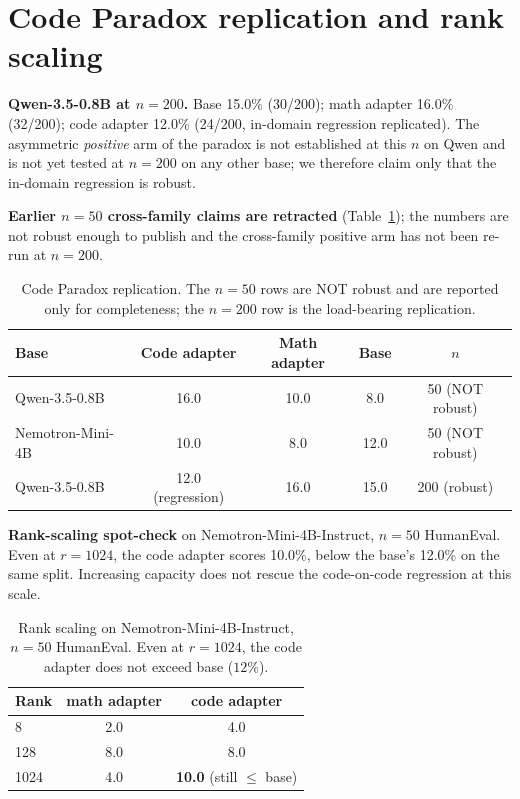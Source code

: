 \documentclass{article}
\begin{document}
\appendix

\section{Code Paradox replication and rank scaling}
\label{app:replication}

\textbf{Qwen-3.5-0.8B at $n=200$.} Base 15.0\% (30/200); math adapter 16.0\% (32/200); code adapter 12.0\% (24/200, in-domain regression replicated). The asymmetric \emph{positive} arm of the paradox is not established at this $n$ on Qwen and is not yet tested at $n=200$ on any other base; we therefore claim only that the in-domain regression is robust.

\textbf{Earlier $n=50$ cross-family claims are retracted} (Table~\ref{tab:replication-app}); the numbers are not robust enough to publish and the cross-family positive arm has not been re-run at $n=200$.

\begin{table}[h]
  \caption{Code Paradox replication. The $n=50$ rows are NOT robust and are reported only for completeness; the $n=200$ row is the load-bearing replication.}
  \label{tab:replication-app}
  \centering
  \small
  \begin{tabular}{lcccc}
    \toprule
    Base & Code adapter & Math adapter & Base & $n$ \\
    \midrule
    Qwen-3.5-0.8B    & 16.0 & 10.0 &  8.0 & 50 (NOT robust) \\
    Nemotron-Mini-4B & 10.0 &  8.0 & 12.0 & 50 (NOT robust) \\
    Qwen-3.5-0.8B    & 12.0 (regression) & 16.0 & 15.0 & 200 (robust) \\
    \bottomrule
  \end{tabular}
\end{table}

\textbf{Rank-scaling spot-check} on Nemotron-Mini-4B-Instruct, $n=50$ HumanEval. Even at $r=1024$, the code adapter scores 10.0\%, below the base's 12.0\% on the same split. Increasing capacity does not rescue the code-on-code regression at this scale.

\begin{table}[h]
  \caption{Rank scaling on Nemotron-Mini-4B-Instruct, $n=50$ HumanEval. Even at $r=1024$, the code adapter does not exceed base ($12\%$).}
  \label{tab:rank-app}
  \centering
  \small
  \begin{tabular}{lcc}
    \toprule
    Rank & math adapter & code adapter \\
    \midrule
    8    & 2.0 & 4.0 \\
    128  & 8.0 & 8.0 \\
    1024 & 4.0 & \textbf{10.0} (still $\leq$ base) \\
    \bottomrule
  \end{tabular}
\end{table}
\end{document}
